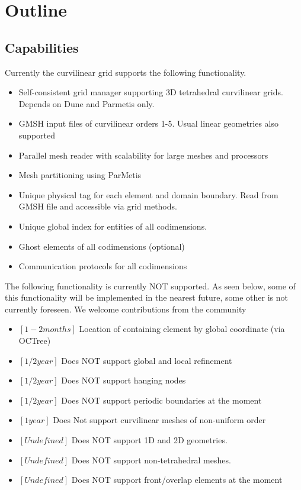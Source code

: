 \section{Outline}
\label{section-outline}

\subsection{Capabilities}
\label{section-outline-capabilities}

\noindent
Currently the curvilinear grid supports the following functionality.
\begin{itemize}
	\item Self-consistent grid manager supporting 3D tetrahedral curvilinear grids. Depends on Dune and Parmetis only.
	\item GMSH input files of curvilinear orders 1-5. Usual linear geometries also supported
	\item Parallel mesh reader with scalability for large meshes and processors
	\item Mesh partitioning using ParMetis \citeParMetis
	\item Unique physical tag for each element and domain boundary. Read from GMSH file and accessible via grid methods.
	\item Unique global index for entities of all codimensions.
	\item Ghost elements of all codimensions (optional)
	\item Communication protocols for all codimensions
\end{itemize}

\noindent
The following functionality is currently NOT supported. As seen below, some of this functionality will be implemented in the nearest future, some other is not currently foreseen. We welcome contributions from the community
\begin{itemize}
	\item $[1-2 months]$ Location of containing element by global coordinate (via OCTree)
	\item $[1/2 year]$  Does NOT support global and local refinement
	\item $[1/2 year]$  Does NOT support hanging nodes
	\item $[1/2 year]$  Does NOT support periodic boundaries at the moment
	\item $[1 year]$    Does Not support curvilinear meshes of non-uniform order
	\item $[Undefined]$ Does NOT support 1D and 2D geometries. 
	\item $[Undefined]$ Does NOT support non-tetrahedral meshes.
	\item $[Undefined]$ Does NOT support front/overlap elements at the moment
\end{itemize}

